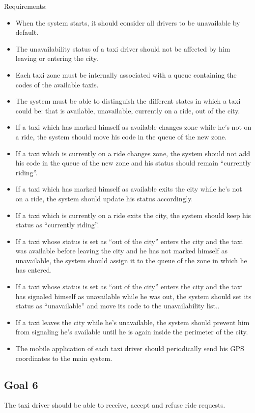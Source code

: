 Requirements:
\begin{itemize}
\item When the system starts, it should consider all drivers to be unavailable by default.
\item The unavailability status of a taxi driver should not be affected by him leaving or entering the city.
\item Each taxi zone must be internally associated with a queue containing the codes of the available taxis.
\item The system must be able to distinguish the different states in which a taxi could be: that is available, unavailable, currently on a ride, out of the city.
\item If a taxi which has marked himself as available changes zone while he's not on a ride, the system should move his code in the queue of the new zone.
\item If a taxi which is currently on a ride changes zone, the system should not add his code in the queue of the new zone and his status should remain ``currently riding''.
\item If a taxi which has marked himself as available exits the city while he's not on a ride, the system should update his status accordingly.
\item If a taxi which is currently on a ride exits the city, the system should keep his status as ``currently riding''. 
\item If a taxi whose status is set as ``out of the city'' enters the city and the taxi was available before leaving the city and he has not marked himself as unavailable, the system should assign it to the queue of the zone in which he has entered.
\item If a taxi whose status is set as “out of the city” enters the city and the taxi has signaled himself as unavailable while he was out, the system should set its status as ``unavailable'' and move its code to the unavailability list.. 
\item If a taxi leaves the city while he's unavailable, the system should prevent him from signaling he's available until he is again inside the perimeter of the city.
\item The mobile application of each taxi driver should periodically send his GPS coordinates to the main system. 
\end{itemize}


\subsection{Goal 6}
The taxi driver should be able to receive, accept and refuse ride requests.

